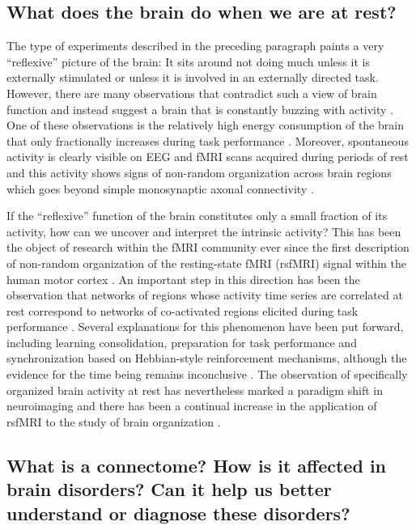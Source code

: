 \subsection{What does the brain do when we are at rest?}

The type of experiments described in the preceding paragraph paints a very
``reflexive'' picture of the brain: It sits around not doing much unless it is
externally stimulated or unless it is involved in an externally directed task.
However, there are many observations that contradict such a view of brain
function and instead suggest a brain that is constantly buzzing with activity
\parencite{raichle2010}. One of these observations is the relatively high
energy consumption of the brain that only fractionally increases during task
performance \parencite{raichle2015}. Moreover, spontaneous activity is clearly
visible on EEG and fMRI scans acquired during periods of rest and this activity
shows signs of non-random organization across brain regions which goes beyond
simple monosynaptic axonal connectivity \parencite{fox2007}.

If the ``reflexive'' function of the brain constitutes only a small fraction of
its activity, how can we uncover and interpret the intrinsic activity? This has
been the object of research within the fMRI community ever since the first
description of non-random organization of the resting-state fMRI (rsfMRI)
signal within the human motor cortex \parencite{biswal1995}. An important step
in this direction has been the observation that networks of regions whose
activity time series are correlated at rest correspond to networks of
co-activated regions elicited during task performance \parencite{smith2009,
crossley2013}. Several explanations for this phenomenon have been put forward,
including learning consolidation, preparation for task performance and
synchronization based on Hebbian-style reinforcement mechanisms, although the
evidence for the time being remains inconclusive \parencite{power2014}. The
observation of specifically organized brain activity at rest has nevertheless
marked a paradigm shift in neuroimaging and there has been a continual increase
in the application of rsfMRI to the study of brain organization
\parencite{snyder2012}. 

\subsection{What is a connectome? How is it affected in brain disorders? Can it
help us better understand or diagnose these disorders?}

